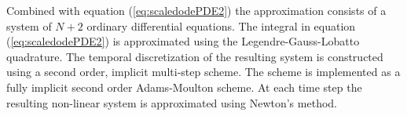 \documentclass[review]{elsarticle}
\begin{document}
Combined with equation (\ref{eq:scaledodePDE2}) the approximation
consists of a system of $N+2$ ordinary differential equations. The
integral in equation (\ref{eq:scaledodePDE2}) is approximated using
the Legendre-Gauss-Lobatto quadrature. The temporal discretization of
the resulting system is constructed using a second order, implicit
multi-step scheme. The scheme is implemented as a fully implicit
second order Adams-Moulton scheme\cite{ascher2011first}. At each time
step the resulting non-linear system is approximated using Newton's
method.



\clearpage
%


\end{document}
